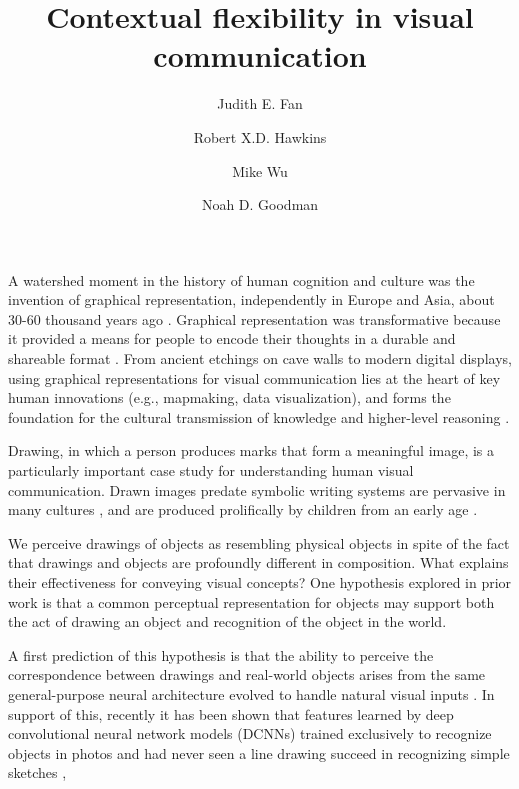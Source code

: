 \documentclass[9pt,twocolumn,twoside]{pnas-new}
\title{Contextual flexibility in visual communication}
\author[a,1]{Judith E. Fan}
\author[a]{Robert X.D. Hawkins}
\author[b]{Mike Wu}
\author[a,b]{Noah D. Goodman}
\affil[a]{Department of Psychology, Stanford University}
\affil[b]{Department of Computer Science, Stanford University}
\begin{document}
\verticaladjustment{-2pt}

\maketitle
\thispagestyle{firststyle}


A watershed moment in the history of human cognition and culture was the invention of graphical representation, independently in Europe and Asia, about 30-60 thousand years ago \cite{hoffmann2018u,Aubert:2014jy}. Graphical representation was transformative because it provided a means for people to encode their thoughts in a durable and shareable format \cite{donald1991origins}. From ancient etchings on cave walls to modern digital displays, using graphical representations for visual communication lies at the heart of key human innovations (e.g., mapmaking, data visualization), and forms the foundation for the cultural transmission of knowledge and higher-level reasoning \cite{tomasello2009cultural,card1999readings}. 

Drawing, in which a person produces marks that form a meaningful image, is a particularly important case study for understanding human visual communication. Drawn images predate symbolic writing systems \cite{clottes2008cave} are pervasive in many cultures \cite{gombrich1989story}, and are produced prolifically by children from an early age \cite{kellogg1969analyzing}.

We perceive drawings of objects as resembling physical objects in spite of the fact that drawings and objects are profoundly different in composition. What explains their effectiveness for conveying visual concepts? One hypothesis explored in prior work is that a common perceptual representation for objects may support both the act of drawing an object and recognition of the object in the world. 

A first prediction of this hypothesis is that the ability to perceive the correspondence between drawings and real-world objects arises from the same general-purpose neural architecture evolved to handle natural visual inputs \cite{Sayim:2011bz,gibson2014ecological}. In support of this, recently it has been shown that features learned by deep convolutional neural network models (DCNNs) trained exclusively to recognize objects in photos and had never seen a line drawing succeed in recognizing simple sketches \cite{fan2015common,yamins2014performance}, 
\end{document}
